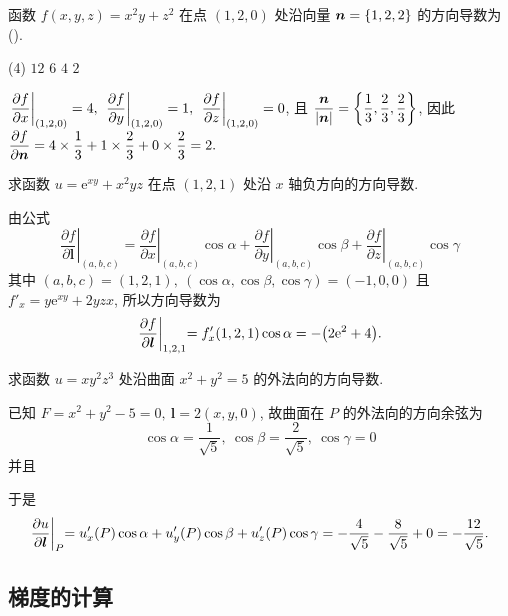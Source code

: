 \begin{example}[2017 数一]
    函数 $f(x,y,z)=x^2y+z^2$ 在点 $(1,2,0)$ 处沿向量 $\vb*{n}=\qty{1,2,2}$ 的方向导数为 (\quad).
    \begin{tasks}(4)
        \task $12$
        \task $6$
        \task $4$
        \task $2$
    \end{tasks}
\end{example}
\begin{solution}
    $\displaystyle \eval{\pdv{f}{x}}_{(1,2,0)}=4,~\eval{\pdv{f}{y}}_{(1,2,0)}=1,~\eval{\pdv{f}{z}}_{(1,2,0)}=0$, 且 $\dfrac{\vb*{n}}{|\vb*{n}|}=\qty{\dfrac{1}{3},\dfrac{2}{3},\dfrac{2}{3}}$, 
    因此 $\displaystyle\pdv{f}{\vb*{n}}=4\times\dfrac{1}{3}+1\times\dfrac{2}{3}+0\times\dfrac{2}{3}=2.$
\end{solution}

\begin{example}
    求函数 $u=\mathrm{e}^{xy}+x^2yz$ 在点 $(1,2,1)$ 处沿 $x$ 轴负方向的方向导数.
\end{example}
\begin{solution}
    由公式
    $$\left.\frac{\partial f}{\partial\boldsymbol{l}}\right|_{(a, b, c)}=\left.\frac{\partial f}{\partial x}\right|_{(a, b, c)} \cos \alpha+\left.\frac{\partial f}{\partial y}\right|_{(a, b, c)} \cos \beta+\left.\frac{\partial f}{\partial z}\right|_{(a, b, c)} \cos \gamma$$
    其中 $(a,b,c)=(1,2,1),~(\cos\alpha,\cos\beta,\cos\gamma)=(-1,0,0)$ 且 $f'_x=y\mathrm{e}^{xy}+2yzx$, 所以方向导数为 
    $$\pdv{f}{\boldsymbol{l}}\biggl |_{1,2,1}=f'_x(1,2,1)\cos\alpha=-\qty(2\mathrm{e}^2+4).$$
\end{solution}

\begin{example}
    求函数 $u=xy^2z^3$ 处沿曲面 $x^2+y^2=5$ 的外法向的方向导数.
\end{example}
\begin{solution}
    已知 $F=x^2+y^2-5=0,~\boldsymbol{l}=2(x,y,0)$, 故曲面在 $P$ 的外法向的方向余弦为
    $$\cos\alpha=\dfrac{1}{\sqrt{5}},~\cos\beta=\dfrac{2}{\sqrt{5}},~\cos\gamma=0$$
    并且
    于是 $$\pdv{u}{\boldsymbol{l}}\biggl |_P=u'_x(P)\cos\alpha+u'_y(P)\cos\beta+u'_z(P)\cos\gamma=-\dfrac{4}{\sqrt{5}}-\dfrac{8}{\sqrt{5}}+0=-\dfrac{12}{\sqrt{5}}.$$
\end{solution}

\subsection{梯度的计算}

